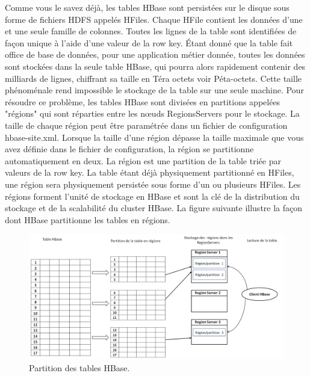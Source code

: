 \newpage
Comme vous le savez déjà, les tables HBase sont persistées sur le disque sous forme de fichiers HDFS appelés HFiles. Chaque HFile contient les données d'une et une seule famille de colonnes. Toutes les lignes de la table sont identifiées de façon unique à l'aide d'une valeur de la row key. Étant donné que la table fait office de base de données, pour une application métier donnée, toutes les données sont stockées dans la seule table HBase, qui pourra alors rapidement contenir des milliards de lignes, chiffrant sa taille en Téra octets voir Péta-octets. Cette taille phénoménale rend impossible le stockage de la table sur une seule machine. Pour résoudre ce problème, les tables HBase sont divisées en partitions appelées "régions" qui sont réparties entre les nœuds RegionsServers pour le stockage. La taille de chaque région peut être paramétrée dans un fichier de configuration hbase-site.xml. Lorsque la taille d'une région dépasse la taille maximale que vous avez définie dans le fichier de configuration, la région se partitionne automatiquement en deux. La région est une partition de la table triée par valeurs de la row key. La table étant déjà physiquement partitionné en HFiles, une région sera physiquement persistée sous forme d'un ou plusieurs HFiles. Les régions forment l'unité de stockage en HBase et sont la clé de la distribution du stockage et de la scalabilité du cluster HBase. La figure suivante illustre la façon dont HBase partitionne les tables en régions.

\begin{figure}[h]
	\centering
    \includegraphics[scale=0.5]{img/part2/2.3}
    \caption{Partition des tables HBase.}
\end{figure}

